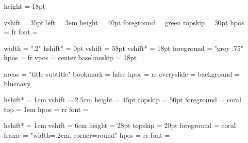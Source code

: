 \def\everyslide{%
  \position{titlebar}\slidetitle
  \presentationonly{
    \position{math}{%
      ${a\over b}=\sqrt2$\par
      $({a\over b})^2=2$\par
      ${a^2\over b^2}=2$\par
      $a^2=2b^2$\par
      $(2k)^2=2b^2$\par
      $4k^2=2b^2$\par
      $2k^2=b^2$\par
      ${a\over b}\neq\sqrt2$}}
  }

%
%

  height = 18pt



  vshift     = 35pt
  left       = 3em
  height     = 40pt
  foreground = green
  topskip    = 30pt
  hpos       = fr
  font       = \slidetitlefont

%
%
  width      = ".2\pdfpagewidth"
  hshift*    = 0pt
  vshift     = 58pt
  vshift*    = 18pt
  foreground = "grey .75"
  hpos       = fr
  vpos       = center
  baselineskip = 18pt


%
%
  areas      = "title subtitle"
  bookmark   = false
  hpos       = rr
  everyslide = {}
  background = bluenavy

  hshift*    = 1cm
  vshift     = 2.5cm
  height     = 45pt
  topskip    = 50pt
  foreground = coral
  top        = 1em
  hpos       = rr
  font       = \maintitlefont

  hshift*    = 1cm
  vshift     = 6cm
  height     = 28pt
  topskip    = 20pt
  foreground = coral
  frame      = "width=.2em, corner=round"
  hpos       = rr
  font       = \mainsubtitlefont

